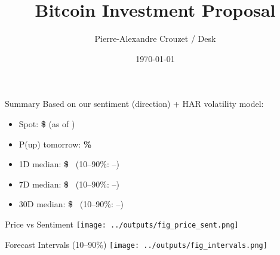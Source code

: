 \documentclass[11pt]{beamer}
\title{Bitcoin Investment Proposal}
\author{Pierre-Alexandre Crouzet / Desk}
\date{\today}
\begin{document}

\begin{frame}
  \titlepage
\end{frame}

\begin{frame}{Summary}
  Based on our sentiment (direction) + HAR volatility model:
  \begin{itemize}
    \item Spot: \textbf{\$ \spotUSD} \hfill (as of \reportDate)
    \item P(up) tomorrow: \textbf{\probUpOneDay\%}
    \item 1D median: \textbf{\$ \pOneMed} \ (10–90\%: –)
    \item 7D median: \textbf{\$ \pSevenMed} \ (10–90\%: –)
    \item 30D median: \textbf{\$ \pThirtyMed} \ (10–90\%: –)
  \end{itemize}
\end{frame}

\begin{frame}{Price vs Sentiment}
  \centering
  \texttt{[image: ../outputs/fig\_price\_sent.png]}
\end{frame}

\begin{frame}{Forecast Intervals (10–90\%)}
  \centering
  \texttt{[image: ../outputs/fig\_intervals.png]}
\end{frame}
\end{document}
